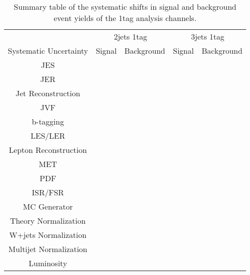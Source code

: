 \begin{table}
\begin{center}
\begin{tabular}{|c|cc|cc|}
\hline
 & \multicolumn{2}{|c|}{2jets 1tag} & \multicolumn{2}{|c|}{3jets 1tag} \\
Systematic Uncertainty & Signal & Background & Signal & Background \\
\hline
JES & & & & \\
JER & & & & \\
Jet Reconstruction & & & &\\
JVF & & & & \\
b-tagging & & & & \\
LES/LER & & & & \\
Lepton Reconstruction & & & & \\
MET & & & & \\
PDF & & & & \\
ISR/FSR & & & & \\
MC Generator & & & & \\
Theory Normalization & & & & \\
W+jets Normalization & & & & \\
Multijet Normalization & & & & \\
Luminosity & & & & \\
\hline
\end{tabular}
\caption{Summary table of the systematic shifts in signal and background event yields of the 1tag analysis channels.}
\label{TABLE-RESULTS-1TAGSYSTEMATICS}
\end{center}
\end{table}

